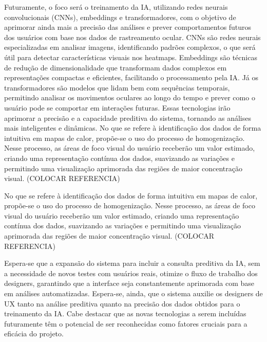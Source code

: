 Futuramente, o foco será o treinamento da IA, utilizando redes neurais convolucionais (CNNs), embeddings e transformadores, com o objetivo de aprimorar ainda mais a precisão das análises e prever comportamentos futuros dos usuários com base nos dados de rastreamento ocular. CNNs são redes neurais especializadas em analisar imagens, identificando padrões complexos, o que será útil para detectar características visuais nos heatmaps. Embeddings são técnicas de redução de dimensionalidade que transformam dados complexos em representações compactas e eficientes, facilitando o processamento pela IA. Já os transformadores são modelos que lidam bem com sequências temporais, permitindo analisar os movimentos oculares ao longo do tempo e prever como o usuário pode se comportar em interações futuras. Essas tecnologias irão aprimorar a precisão e a capacidade preditiva do sistema, tornando as análises mais inteligentes e dinâmicas.
No que se refere à identificação dos dados de forma intuitiva em mapas de calor, propõe-se o uso do processo de homogenização. Nesse processo, as áreas de foco visual do usuário receberão um valor estimado, criando uma representação contínua dos dados, suavizando as variações e permitindo uma visualização aprimorada das regiões de maior concentração visual. (COLOCAR REFERENCIA)

No que se refere à identificação dos dados de forma intuitiva em mapas de calor, propõe-se o uso do processo de homogenização. Nesse processo, as áreas de foco visual do usuário receberão um valor estimado, criando uma representação contínua dos dados, suavizando as variações e permitindo uma visualização aprimorada das regiões de maior concentração visual. (COLOCAR REFERENCIA)

Espera-se que a expansão do sistema para incluir a consulta preditiva da IA, sem a necessidade de novos testes com usuários reais, otimize o fluxo de trabalho dos designers, garantindo que a interface seja constantemente aprimorada com base em análises automatizadas. Espera-se, ainda, que o sistema auxilie os designers de UX tanto na análise preditiva quanto na precisão dos dados obtidos para o treinamento da IA. Cabe destacar que as novas tecnologias a serem incluídas futuramente têm o potencial de ser reconhecidas como fatores cruciais para a eficácia do projeto.